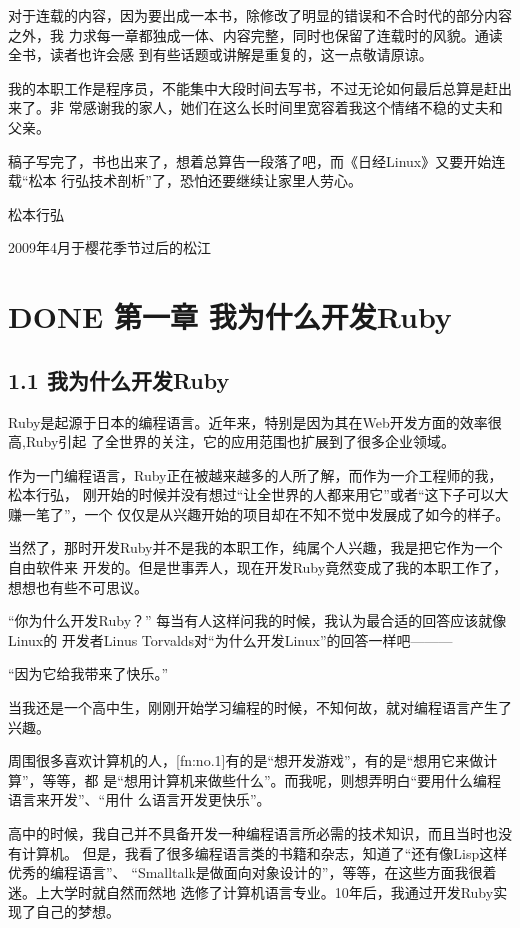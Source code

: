 \documentclass[color=cyan,mathpazo,titlestyle=hang]{elegantbook}
\begin{document}
对于连载的内容，因为要出成一本书，除修改了明显的错误和不合时代的部分内容之外，我
力求每一章都独成一体、内容完整，同时也保留了连载时的风貌。通读全书，读者也许会感
到有些话题或讲解是重复的，这一点敬请原谅。

我的本职工作是程序员，不能集中大段时间去写书，不过无论如何最后总算是赶出来了。非
常感谢我的家人，她们在这么长时间里宽容着我这个情绪不稳的丈夫和父亲。

稿子写完了，书也出来了，想着总算告一段落了吧，而《日经Linux》又要开始连载“松本
行弘技术剖析”了，恐怕还要继续让家里人劳心。

松本行弘

2009年4月于樱花季节过后的松江


\section{{\bfseries\sffamily DONE} 第一章 我为什么开发Ruby}
\label{sec:org37c698a}
\subsection{1.1 我为什么开发Ruby}
\label{sec:orga8ebd75}

Ruby是起源于日本的编程语言。近年来，特别是因为其在Web开发方面的效率很高,Ruby引起
了全世界的关注，它的应用范围也扩展到了很多企业领域。

作为一门编程语言，Ruby正在被越来越多的人所了解，而作为一介工程师的我，松本行弘，
刚开始的时候并没有想过“让全世界的人都来用它”或者“这下子可以大赚一笔了”，一个
仅仅是从兴趣开始的项目却在不知不觉中发展成了如今的样子。

当然了，那时开发Ruby并不是我的本职工作，纯属个人兴趣，我是把它作为一个自由软件来
开发的。但是世事弄人，现在开发Ruby竟然变成了我的本职工作了，想想也有些不可思议。

“你为什么开发Ruby？” 每当有人这样问我的时候，我认为最合适的回答应该就像Linux的
开发者Linus Torvalds对“为什么开发Linux”的回答一样吧———

“因为它给我带来了快乐。”

当我还是一个高中生，刚刚开始学习编程的时候，不知何故，就对编程语言产生了兴趣。

周围很多喜欢计算机的人，[fn:no.1]有的是“想开发游戏”，有的是“想用它来做计算”，等等，都
是“想用计算机来做些什么”。而我呢，则想弄明白“要用什么编程语言来开发”、“用什
么语言开发更快乐”。

高中的时候，我自己并不具备开发一种编程语言所必需的技术知识，而且当时也没有计算机。
但是，我看了很多编程语言类的书籍和杂志，知道了“还有像Lisp这样优秀的编程语言”、
“Smalltalk是做面向对象设计的”，等等，在这些方面我很着迷。上大学时就自然而然地
选修了计算机语言专业。10年后，我通过开发Ruby实现了自己的梦想。
\end{document}
